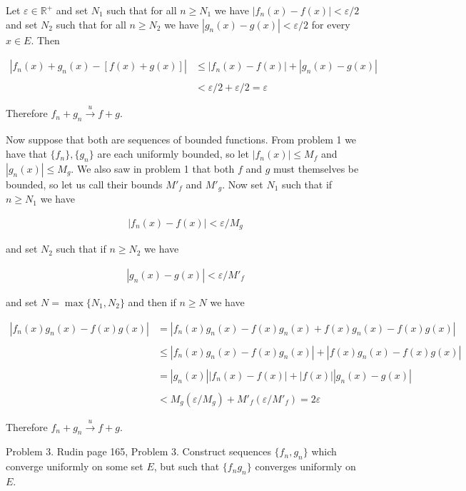\documentclass{article}
\begin{document}
  \vspace{1cm} 

  Let $\varepsilon\in\mathbb R^+$ and set $N_1$ such that for all $n\geq N_1$ we have $|f_n(x)-f(x)|<\varepsilon/2$ and set $N_2$ such that for all $n\geq N_2$ we have $|g_n(x)-g(x)|<\varepsilon/2$ for every $x\in E$.  Then 

  \begin{align*}
    |f_n(x)+g_n(x)-[f(x)+g(x)]| &\leq |f_n(x)-f(x)|+|g_n(x)-g(x)| \\\\
    &< \varepsilon/2+\varepsilon/2 = \varepsilon
  \end{align*}

  Therefore $f_n+g_n\xrightarrow[]{u} f+g$. 

  Now suppose that both are sequences of bounded functions.  From problem 1 we have that $\{f_n\},\{g_n\}$ are each uniformly bounded, so let $|f_n(x)|\le M_f$ and $|g_n(x)|\le M_g$. We also saw in problem 1 that both $f$ and $g$ must themselves be bounded, so let us call their bounds $M'_f$ and $M'_g$.  Now set $N_1$ such that if $n\geq N_1$ we have

  \begin{align*}
    |f_n(x)-f(x)|<\varepsilon/M_g
  \end{align*}

  and set $N_2$ such that if $n\geq N_2$ we have 

  \begin{align*}
    |g_n(x)-g(x)|<\varepsilon/M'_f
  \end{align*}

  and set $N=\max\{N_1,N_2\}$ and then if $n\geq N$ we have 

  \begin{align*}
    |f_n(x)g_n(x)-f(x)g(x)| &= |f_n(x)g_n(x)-f(x)g_n(x)+f(x)g_n(x) - f(x) g(x)| \\\\
    & \leq |f_n(x)g_n(x)-f(x)g_n(x)|+|f(x)g_n(x) - f(x) g(x)| \\\\
    &= |g_n(x)||f_n(x)-f(x)| + |f(x)||g_n(x)-g(x)| \\\\
    &< M_g(\varepsilon/M_g)+M'_f(\varepsilon/M'_f) = 2\varepsilon
  \end{align*}

  Therefore $f_n+g_n\xrightarrow{u} f+g$.

\pagebreak
  
  {\Large \color{Sepia} Problem 3. Rudin page 165, Problem 3. Construct sequences $\{f_n,g_n\}$ which converge uniformly on some set $E$, but such that $\{f_ng_n\}$ converges uniformly on $E$.} 
\end{document}
